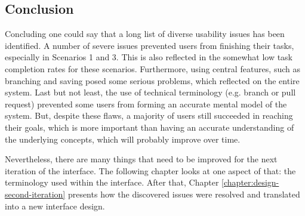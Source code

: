 
\subsection{Conclusion} \label{sec:summary-usability-problems}
Concluding one could say that a long list of diverse usability issues has been identified. A number of severe issues prevented users from finishing their tasks, especially in Scenarios 1 and 3. This is also reflected in the somewhat low task completion rates for these scenarios.
Furthermore, using central features, such as branching and saving posed some serious problems, which reflected on the entire system. Last but not least, the use of technical terminology (e.g. branch or pull request) prevented some users from forming an accurate mental model of the system. But, despite these flaws, a majority of users still succeeded in reaching their goals, which is more important than having an accurate understanding of the underlying concepts, which will probably improve over time.

Nevertheless, there are many things that need to be improved for the next iteration of the interface. The following chapter looks at one aspect of that: the terminology used within the interface. After that, Chapter \ref{chapter:design-second-iteration} presents how the discovered issues were resolved and translated into a new interface design.





